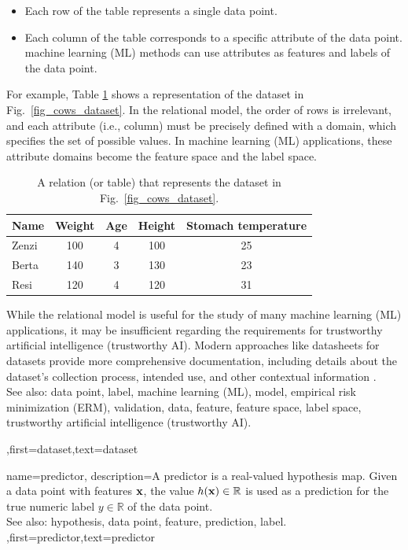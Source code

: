 {{\begin{itemize}
		\item Each row of the table represents a single data point.
		\item Each column of the table corresponds to a specific attribute of the data point. 
		machine learning (ML) methods can use attributes as features and labels of the data point.
		\end{itemize}
		For example, Table \ref{tab:cowdata} shows a representation of the dataset in Fig.\ \ref{fig_cows_dataset}. 
		In the relational model, the order of rows is irrelevant, and each attribute (i.e., column) must be 
		precisely defined with a domain, which specifies the set of possible values. In machine learning (ML) applications, 
		these attribute domains become the feature space and the label space.
		\begin{table}[H]
			\centering
			\begin{tabular}{lcccc}
				\hline
				\textbf{Name} & \textbf{Weight} & \textbf{Age} & \textbf{Height} & \textbf{Stomach temperature} \\
				\hline
				Zenzi & 100 & 4 & 100 & 25 \\
				Berta & 140 & 3 & 130 & 23 \\
				Resi  & 120 & 4 & 120 & 31 \\
				\hline
			\end{tabular}
			\caption{A relation (or table) that represents the dataset in Fig.\ \ref{fig_cows_dataset}.}
			\label{tab:cowdata}
		\end{table}
 While the relational model is useful for the study of many machine learning (ML) applications, it may be 
 insufficient regarding the requirements for trustworthy artificial intelligence (trustworthy AI). Modern 
 approaches like datasheets for datasets provide more comprehensive 
 documentation, including details about the dataset’s collection process, intended 
 use, and other contextual information \cite{DatasheetData2021}.
 		\\
		See also: data point, label, machine learning (ML), model, empirical risk minimization (ERM), validation, data, feature, feature space, label space, trustworthy artificial intelligence (trustworthy AI).},first={dataset},text={dataset}  
}

{name={predictor},
	description={A predictor is a real-valued hypothesis map. 
		Given a data point with features ${\bf x}$, the value 
		$h({\bf x}) \in \mathbb{R}$ is used as a prediction for the true 
		numeric label $y \in \mathbb{R}$ of the data point.
				\\
		See also: hypothesis, data point, feature, prediction, label. },first={predictor},text={predictor}  
}

